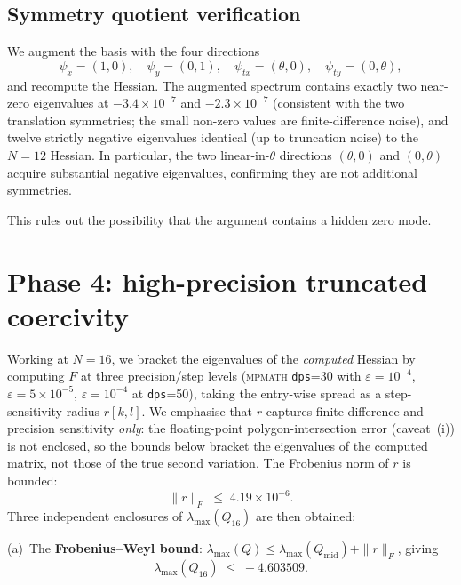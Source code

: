 \documentclass[11pt]{amsart}
\theoremstyle{plain}
\theoremstyle{definition}
\newcommand{\eps}{\varepsilon}
\begin{document}
\subsection{Symmetry quotient verification}\label{sec:symmetry-quotient}

We augment the basis with the four directions
\begin{equation}
  \psi_{x} = (1, 0), \quad \psi_{y} = (0, 1),
  \quad \psi_{tx} = (\theta, 0), \quad \psi_{ty} = (0, \theta),
\end{equation}
and recompute the Hessian.  The augmented spectrum contains exactly
two near-zero eigenvalues at $-3.4 \times 10^{-7}$ and $-2.3 \times
10^{-7}$ (consistent with the two translation symmetries; the small
non-zero values are finite-difference noise), and twelve strictly
negative eigenvalues identical (up to truncation noise) to the
$N=12$ Hessian.  In particular, the two linear-in-$\theta$ directions
$(\theta, 0)$ and $(0, \theta)$ acquire substantial negative
eigenvalues, confirming they are not additional symmetries.

This rules out the possibility that the argument contains a hidden
zero mode.

\section{Phase 4: high-precision truncated coercivity}\label{sec:phase4}

Working at $N=16$, we bracket the eigenvalues of the \emph{computed}
Hessian by computing $F$ at three precision/step
levels (\textsc{mpmath} \texttt{dps}=30 with $\eps = 10^{-4}$,
$\eps = 5 \times 10^{-5}$, $\eps = 10^{-4}$ at \texttt{dps}=50),
taking the entry-wise spread as a step-sensitivity radius $r[k, l]$.
We emphasise that $r$ captures finite-difference and precision
sensitivity \emph{only}: the floating-point polygon-intersection error
(caveat~(i)) is not enclosed, so the bounds below bracket the
eigenvalues of the computed matrix, not those of the true second
variation.
The Frobenius norm of $r$ is bounded:
\begin{equation}
  \|r\|_{F} \;\leq\; 4.19 \times 10^{-6}.
\end{equation}
Three independent enclosures of $\lambda_{\max}(Q_{16})$ are then
obtained:

(a)~The \textbf{Frobenius--Weyl bound}: $\lambda_{\max}(Q) \leq
\lambda_{\max}(Q_{\mathrm{mid}}) + \|r\|_{F}$, giving
\begin{equation}
  \lambda_{\max}(Q_{16}) \;\leq\; -4.603509.
\end{equation}
\end{document}
